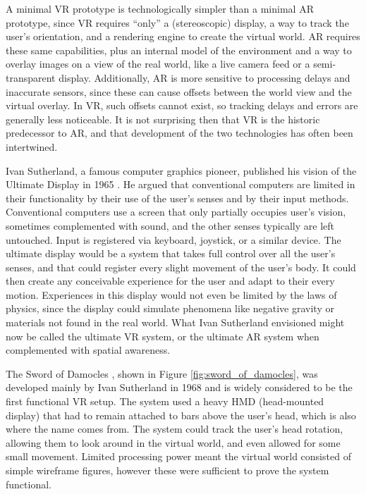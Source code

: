 A minimal VR prototype is technologically simpler than a minimal AR prototype, since VR requires ``only'' a (stereoscopic) display, a way to track the user's orientation, and a rendering engine to create the virtual world. AR requires these same capabilities, plus an internal model of the environment and a way to overlay images on a view of the real world, like a live camera feed or a semi-transparent display. Additionally, AR is more sensitive to processing delays and inaccurate sensors, since these can cause offsets between the world view and the virtual overlay. In VR, such offsets cannot exist, so tracking delays and errors are generally less noticeable. It is not surprising then that VR is the historic predecessor to AR, and that development of the two technologies has often been intertwined.

Ivan Sutherland, a famous computer graphics pioneer, published his vision of the Ultimate Display in 1965 \cite{sutherland1965ultimate}. He argued that conventional computers are limited in their functionality by their use of the user's senses and by their input methods. Conventional computers use a screen that only partially occupies user's vision, sometimes complemented with sound, and the other senses typically are left untouched. Input is registered via keyboard, joystick, or a similar device. The ultimate display would be a system that takes full control over all the user's senses, and that could register every slight movement of the user's body. It could then create any conceivable experience for the user and adapt to their every motion. Experiences in this display would not even be limited by the laws of physics, since the display could simulate phenomena like negative gravity or materials not found in the real world. What Ivan Sutherland envisioned might now be called the ultimate VR system, or the ultimate AR system when complemented with spatial awareness.

The Sword of Damocles \cite{sutherland1968head}, shown in Figure \ref{fig:sword_of_damocles}, was developed mainly by Ivan Sutherland in 1968 and is widely considered to be the first functional VR setup. The system used a heavy HMD (head-mounted display) that had to remain attached to bars above the user's head, which is also where the name comes from. The system could track the user's head rotation, allowing them to look around in the virtual world, and even allowed for some small movement. Limited processing power meant the virtual world consisted of simple wireframe figures, however these were sufficient to prove the system functional.

